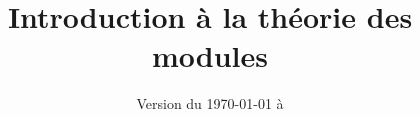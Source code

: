 \documentclass[11pt,a4paper]{book}
\theoremstyle{definition}
\begin{document}
\title{Introduction à la théorie des modules}
\date{Version du \today{} à \currenttime}
\maketitle


\tableofcontents








\end{document}
